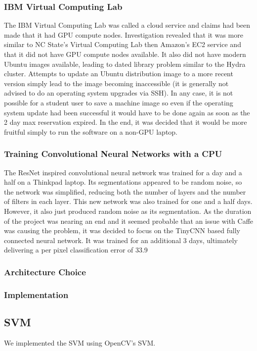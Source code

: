 \documentclass[12pt]{article}
\begin{document}
\subsubsection{IBM Virtual Computing Lab}

	The IBM Virtual Computing Lab was called a cloud service and claims had been made that it had GPU compute nodes.  Investigation revealed that it was more similar to NC State's Virtual Computing Lab then Amazon's EC2 service and that it did not have GPU compute nodes available.  It also did not have modern Ubuntu images available, leading to dated library problem similar to the Hydra cluster.  Attempts to update an Ubuntu distribution image to a more recent version simply lead to the image becoming inaccessible (it is generally not advised to do an operating system upgrades via SSH).  In any case, it is not possible for a student user to save a machine image so even if the operating system update had been successful it would have to be done again as soon as the 2 day max reservation expired.  In the end, it was decided that it would be more fruitful simply to run the software on a non-GPU laptop.

\subsubsection{Training Convolutional Neural Networks with a CPU}

	The ResNet inspired convolutional neural network was trained for a day and a half on a Thinkpad laptop.  Its segmentations appeared to be random noise, so the network was simplified, reducing both the number of layers and the number of filters in each layer.  This new network was also trained for one and a half days.  However, it also just produced random noise as its segmentation.  As the duration of the project was nearing an end and it seemed probable that an issue with Caffe was causing the problem, it was decided to focus on the TinyCNN based fully connected neural network.  It was trained for an additional 3 days, ultimately delivering a per pixel classification error of 33.9%


	\subsubsection{Architecture Choice}
	\subsubsection{Implementation}
	\subsection{SVM}
	We implemented the SVM using OpenCV's SVM.
\end{document}
